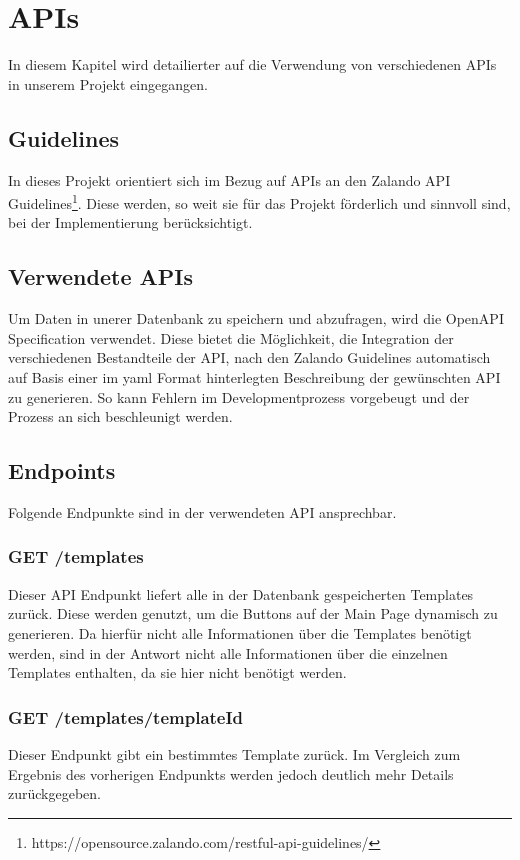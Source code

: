 \chapter{\ac{API}s}\label{ch:apis}
In diesem Kapitel wird detailierter auf die Verwendung von verschiedenen \ac{API}s in unserem Projekt
eingegangen.

\section{Guidelines}
In dieses Projekt orientiert sich im Bezug auf \ac{API}s an den Zalando API Guidelines\footnote{https://opensource.zalando.com/restful-api-guidelines/}. 
Diese werden, so weit sie für das Projekt förderlich und sinnvoll sind, bei der Implementierung 
berücksichtigt.

\section{Verwendete \ac{API}s}
Um Daten in unerer Datenbank zu speichern und abzufragen, wird die OpenAPI Specification 
verwendet. Diese bietet die Möglichkeit, die Integration der verschiedenen Bestandteile der 
\ac{API}, nach den Zalando Guidelines automatisch auf Basis einer im yaml Format hinterlegten 
Beschreibung der gewünschten \ac{API} zu generieren. So kann Fehlern im Developmentprozess 
vorgebeugt und der Prozess an sich beschleunigt werden.

\section{Endpoints}
Folgende Endpunkte sind in der verwendeten \ac{API} ansprechbar.

\subsection{GET /templates}

Dieser \ac{API} Endpunkt liefert alle in der Datenbank gespeicherten Templates zurück. Diese
 werden genutzt, um die Buttons auf der Main Page dynamisch zu generieren. Da hierfür nicht 
 alle Informationen über die Templates benötigt werden, sind in der Antwort nicht alle 
 Informationen über die einzelnen Templates enthalten, da sie hier nicht benötigt werden.

 \subsection{GET /templates/{templateId}}
 Dieser Endpunkt gibt ein bestimmtes Template zurück. Im Vergleich zum Ergebnis des vorherigen 
 Endpunkts werden jedoch deutlich mehr Details zurückgegeben.

